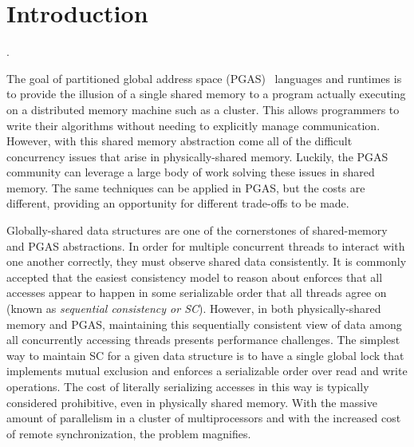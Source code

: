 \section{Introduction}
.

The goal of partitioned global address space (PGAS)~\cite{upc:2005} languages and runtimes is to provide the illusion of a single shared memory to a program actually executing on a distributed memory machine such as a cluster. This allows programmers to write their algorithms without needing to explicitly manage communication. 
However, with this shared memory abstraction come all of the difficult concurrency issues that arise in physically-shared memory. Luckily, the PGAS community can leverage a large body of work solving these issues in shared memory.
The same techniques can be applied in PGAS, but the costs are different, providing an opportunity for different trade-offs to be made.

Globally-shared data structures are one of the cornerstones of shared-memory and PGAS abstractions. 
In order for multiple concurrent threads to interact with one another correctly, they must observe shared data consistently. It is commonly accepted that the easiest consistency model to reason about enforces that all accesses appear to happen in some serializable order that all threads agree on (known as \emph{sequential consistency or SC}).
However, in both physically-shared memory and PGAS, maintaining this sequentially consistent view of data among all concurrently accessing threads presents performance challenges.
The simplest way to maintain SC for a given data structure is to have a single global lock that implements mutual exclusion and enforces a serializable order over read and write operations. The cost of literally serializing accesses in this way is typically considered prohibitive, even in physically shared memory.
With the massive amount of parallelism in a cluster of multiprocessors and with the increased cost of remote synchronization, the problem magnifies.

